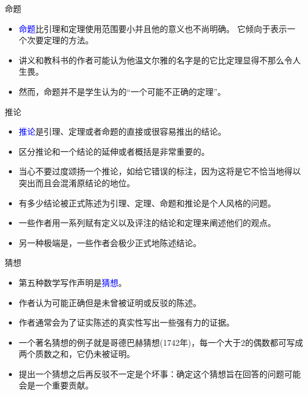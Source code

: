 \documentclass[13pt]{ctexbeamer}
\newcommand{\blue}[1]{\textcolor{blue}{#1}}
\begin{document}
\begin{frame}{命题}
\begin{itemize}
	\item 
\blue{命题}比引理和定理使用范围要小并且他的意义也不尚明确。
它倾向于表示一个次要定理的方法。
\item 讲义和教科书的作者可能认为他温文尔雅的名字是的它比定理显得不那么令人生畏。
 \item 然而，命题并不是学生认为的“一个可能不正确的定理”。
\end{itemize}
\end{frame}

\begin{frame}{推论}
\begin{itemize}
\item \blue{推论}是引理、定理或者命题的直接或很容易推出的结论。
\item 区分推论和一个结论的延伸或者概括是非常重要的。
\item 当心不要过度颂扬一个推论，如给它错误的标注，因为这将是它不恰当地得以突出而且会混淆原结论的地位。
\end{itemize}
\end{frame}

\begin{frame}
\begin{itemize}
\item 有多少结论被正式陈述为引理、定理、命题和推论是个人风格的问题。
\item 一些作者用一系列赋有定义以及评注的结论和定理来阐述他们的观点。
\item 另一种极端是，一些作者会极少正式地陈述结论。
\end{itemize}
\end{frame}

\begin{frame}{猜想}
\begin{itemize}
\item 第五种数学写作声明是\blue{猜想}。
\item 作者认为可能正确但是未曾被证明或反驳的陈述。
\item 作者通常会为了证实陈述的真实性写出一些强有力的证据。
\item  一个著名猜想的例子就是哥德巴赫猜想(1742年)，每一个大于2的偶数都可写成两个质数之和，它仍未被证明。
\item 提出一个猜想之后再反驳不一定是个坏事：确定这个猜想旨在回答的问题可能会是一个重要贡献。

\end{itemize}
\end{frame}
\end{document}
